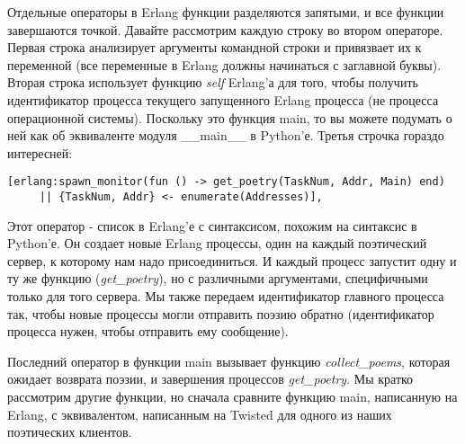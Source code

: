 Отдельные операторы в Erlang функции разделяются запятыми, 
и все функции завершаются точкой. Давайте рассмотрим  
каждую строку во втором операторе. Первая строка анализирует  
аргументы командной строки и привязвает их к переменной (все 
переменные в Erlang должны начинаться с заглавной буквы). Вторая строка 
использует функцию \textit{self} Erlang'а для того, чтобы получить 
идентификатор процесса текущего запущенного Erlang процесса (не 
процесса операционной системы). Поскольку это функция main, то 
вы можете подумать о ней как об эквиваленте модуля \_\_main\_\_ в Python'е. 
Третья строчка гораздо интересней: 

 \begin{verbatim}
[erlang:spawn_monitor(fun () -> get_poetry(TaskNum, Addr, Main) end)
     || {TaskNum, Addr} <- enumerate(Addresses)],
\end{verbatim} 


Этот оператор - список в Erlang'е с синтаксисом, 
похожим на синтаксис в Python'е. Он создает новые Erlang 
процессы, один на каждый поэтический сервер, к которому 
нам надо присоединиться. И каждый процесс запустит одну и ту же 
функцию (\textit{get\_poetry}), но с различными аргументами, 
специфичными только для того сервера. Мы также передаем идентификатор  
главного процесса так, чтобы новые процессы могли отправить 
поэзию обратно (идентификатор процесса нужен, чтобы отправить ему 
сообщение).


Последний оператор в функции main вызывает функцию 
\textit{collect\_poems}, которая ожидает возврата 
поэзии, и завершения процессов \textit{get\_poetry}. 
Мы кратко рассмотрим другие функции, но сначала сравните 
функцию main, написанную на Erlang, с эквивалентом, 
написанным на Twisted для одного из наших поэтических клиентов.



